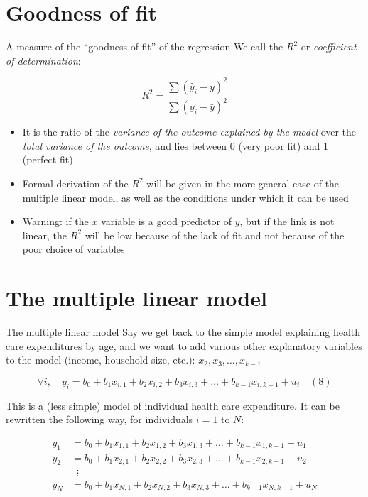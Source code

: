 \documentclass[aspectratio=169]{beamer}
\begin{document}
\section{Goodness of fit}

\begin{frame}{A measure of the ``goodness of fit'' of the regression}
We call the $R^2$ or \textit{coefficient of determination}:

\[R^2 = \frac{\sum(\hat{y}_i - \bar{y})^2}{\sum(y_i - \bar{y})^2}\]

\begin{itemize}
    \item It is the ratio of the \textit{variance of the outcome explained by the model} over the \textit{total variance of the outcome}, and lies between 0 (very poor fit) and 1 (perfect fit)
    \item Formal derivation of the $R^2$ will be given in the more general case of the multiple linear model, as well as the conditions under which it can be used
    \item Warning: if the $x$ variable is a good predictor of $y$, but if the link is not linear, the $R^2$ will be low because of the lack of fit and not because of the poor choice of variables
\end{itemize}
\end{frame}

\section{The multiple linear model}

\begin{frame}{The multiple linear model}
Say we get back to the simple model explaining health care expenditures by age, and we want to add various other explanatory variables to the model (income, household size, etc.): $x_2, x_3, \dots, x_{k-1}$

\[\forall i, \quad y_i = b_0 + b_1x_{i,1} + b_2x_{i,2} + b_3x_{i,3} + \dots + b_{k-1}x_{i,k-1} + u_i \quad (8)\]

This is a (less simple) model of individual health care expenditure. It can be rewritten the following way, for individuals $i = 1$ to $N$:

\begin{align*}
y_1 &= b_0 + b_1x_{1,1} + b_2x_{1,2} + b_3x_{1,3} + \dots + b_{k-1}x_{1,k-1} + u_1\\
y_2 &= b_0 + b_1x_{2,1} + b_2x_{2,2} + b_3x_{2,3} + \dots + b_{k-1}x_{2,k-1} + u_2\\
&\;\;\vdots\\
y_N &= b_0 + b_1x_{N,1} + b_2x_{N,2} + b_3x_{N,3} + \dots + b_{k-1}x_{N,k-1} + u_N
\end{align*}
\end{frame}
\end{document}

